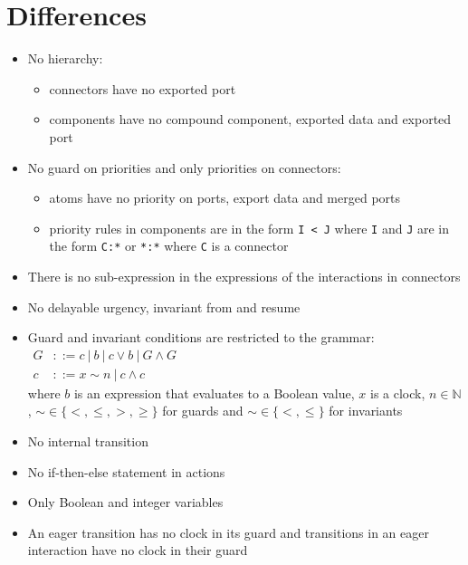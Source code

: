 \documentclass[a4paper]{article}
\begin{document}
\section*{Differences}
\begin{itemize}
  \item No hierarchy:
        \begin{itemize}
          \item connectors have no exported port
          \item components have no compound component, exported data and exported port
        \end{itemize}
  \item No guard on priorities and only priorities on connectors:
        \begin{itemize}
          \item atoms have no priority on ports, export data and merged ports
          \item priority rules in components are in the form \texttt{I < J} where \texttt{I} and \texttt{J} are in the
                form \texttt{C:*} or \texttt{*:*} where \texttt{C} is a connector
        \end{itemize}
  \item There is no sub-expression in the expressions of the interactions in connectors
  \item No delayable urgency, invariant from and resume
  \item Guard and invariant conditions are restricted to the grammar: \\
        $\begin{aligned}
            G & ::= c \:\vert\: b \:\vert\: c \vee b \:\vert\: G \wedge G \\
            c & ::= x \sim n \:\vert\: c \wedge c
          \end{aligned}$ \\
        where $b$ is an expression that evaluates to a Boolean value, $x$ is a clock, $n \in \mathbb{N}$,
        $\sim \in \{<, \leq, >, \geq \}$ for guards and $\sim \in \{<, \leq \}$ for
        invariants
  \item No internal transition
  \item No if-then-else statement in actions
  \item Only Boolean and integer variables
  \item An eager transition has no clock in its guard and transitions in an eager interaction have no clock in their
        guard
\end{itemize}
\end{document}

